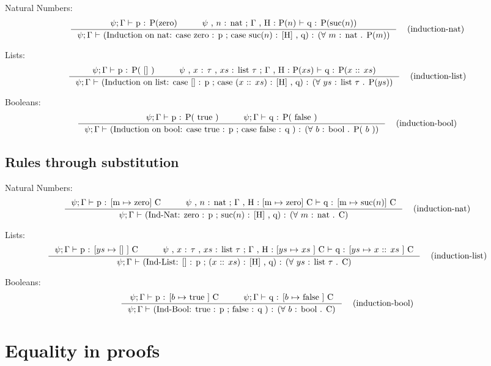 \documentclass[twoside,a4paper]{article}
\theoremstyle{definition}
\begin{document}
Natural Numbers:
\[
\AxiomC{
$\psi ; \Gamma \vdash$ p : P(zero)
}
\AxiomC{
$\psi$ , $n$ : nat ; $\Gamma$ , H : P($n$) $\vdash$ q : P(suc($n$))
}
\RightLabel{\quad (induction-nat)}
\BinaryInfC{
$\psi ; \Gamma$ $\vdash$
(Induction on nat: case zero : p ; case suc($n$) : [H] , q)
: ($\forall$ $m$ : nat . P($m$))
}
\DisplayProof
\]

Lists:
\[
\AxiomC{
$\psi ; \Gamma \vdash$ p : P( [] )
}
\AxiomC{
$\psi$ , $x$ : $\tau$ , $xs$ : list $\tau$ ;
$\Gamma$ , H : P($xs$) $\vdash$ q : P($x$ :: $xs$)
}
\RightLabel{\quad (induction-list)}
\BinaryInfC{
$\psi ; \Gamma$ $\vdash$
(Induction on list: case [] : p ; case ($x$ :: $xs$) : [H] , q)
: ($\forall$ $ys$ : list $\tau$ . P($ys$))
}
\DisplayProof
\]

Booleans:
\[
\AxiomC{
$\psi ; \Gamma \vdash$ p : P( true )
}
\AxiomC{
$\psi ; \Gamma \vdash$ q : P( false )
}
\RightLabel{\quad (induction-bool)}
\BinaryInfC{
$\psi ; \Gamma \vdash$
(Induction on bool: case true : p ; case false : q )
: ($\forall$ $b$ : bool . P( $b$ ))
}
\DisplayProof
\]

\subsection{Rules through substitution}

Natural Numbers:
\[
\AxiomC{
$\psi ; \Gamma \vdash$ p : [m $\mapsto$ zero] C
}
\AxiomC{
$\psi$ , $n$ : nat ; $\Gamma$ , H : [m $\mapsto$ zero] C $\vdash$ q : [m $\mapsto$ suc($n$)] C
}
\RightLabel{\quad (induction-nat)}
\BinaryInfC{
$\psi ; \Gamma$ $\vdash$
(Ind-Nat: zero : p ; suc($n$) : [H] , q)
: ($\forall$ $m$ : nat . C)
}
\DisplayProof
\]

Lists:
\[
\AxiomC{
$\psi ; \Gamma \vdash$ p : [$ys$ $\mapsto$ [] ] C
}
\AxiomC{
$\psi$ , $x$ : $\tau$ , $xs$ : list $\tau$ ;
$\Gamma$ , H : [$ys$ $\mapsto$ $xs$ ] C $\vdash$ q : [$ys$ $\mapsto$ $x$ :: $xs$ ] C
}
\RightLabel{\quad (induction-list)}
\BinaryInfC{
$\psi ; \Gamma$ $\vdash$
(Ind-List: [] : p ; ($x$ :: $xs$) : [H] , q)
: ($\forall$ $ys$ : list $\tau$ . C)
}
\DisplayProof
\]

Booleans:
\[
\AxiomC{
$\psi ; \Gamma \vdash$ p : [$b$ $\mapsto$ true ] C
}
\AxiomC{
$\psi ; \Gamma \vdash$ q : [$b$ $\mapsto$ false ] C
}
\RightLabel{\quad (induction-bool)}
\BinaryInfC{
$\psi ; \Gamma \vdash$
(Ind-Bool: true : p ; false : q )
: ($\forall$ $b$ : bool . C)
}
\DisplayProof
\]

\section{Equality in proofs}
\end{document}

